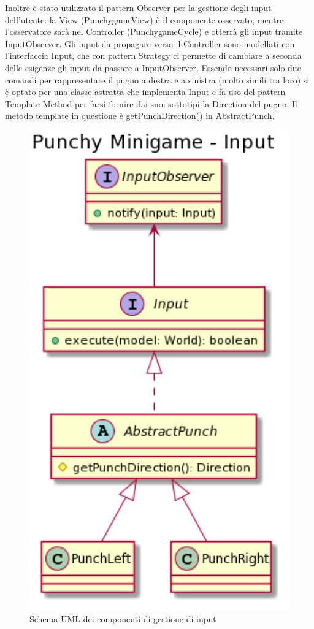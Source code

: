 \documentclass[a4paper,12pt]{report}
\begin{document}
	Inoltre è stato utilizzato il pattern Observer per la gestione degli input dell'utente: la View (PunchygameView) è il componente osservato, mentre l'osservatore sarà nel Controller (PunchygameCycle) e otterrà gli input tramite InputObserver.\newline
	Gli input da propagare verso il Controller sono modellati con l'interfaccia Input, che con pattern Strategy ci permette di cambiare a seconda delle esigenze gli input da passare a InputObserver.
    Essendo necessari solo due comandi per rappresentare il pugno a destra e a sinistra (molto simili tra loro) si è optato per una classe astratta che implementa Input e fa uso del pattern Template Method per farsi fornire dai suoi sottotipi la Direction del pugno.
	Il metodo template in questione è getPunchDirection() in AbstractPunch.
    \begin{figure}[!t]
        \centering{}
        \includegraphics[width=150mm]{images/picchiotti/punchyinput.png}
        \caption{Schema UML dei componenti di gestione di input}
        \label{img:punchyinput}
    \end{figure}
\end{document}
